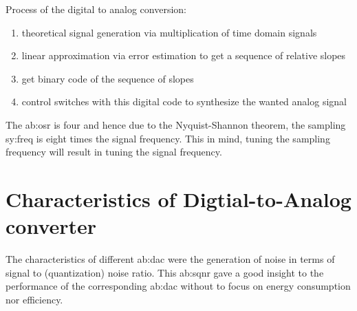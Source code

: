 Process of the digital to analog conversion:
\begin{enumerate}
	\item theoretical signal generation via multiplication of time domain signals
	\item linear approximation via error estimation to get a sequence of relative slopes
	\item get binary code of the sequence of slopes
	\item control switches with this digital code to synthesize the wanted analog signal
\end{enumerate}

The \gls{ab:osr} is four and hence due to the Nyquist-Shannon theorem, the sampling \gls{sy:freq} is eight times the signal frequency.
This in mind, tuning the sampling frequency will result in tuning the signal frequency.

\section{Characteristics of Digtial-to-Analog converter}
\label{ch:characteristics}
The characteristics of different \gls{ab:dac} were the generation of noise in terms of signal to (quantization) noise ratio.
This \gls{ab:sqnr} gave a good insight to the performance of the corresponding \gls{ab:dac} without to focus on energy consumption nor efficiency.


